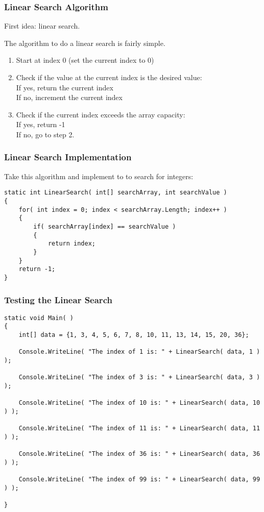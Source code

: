 \begin{frame}
\frametitle{Linear Search Algorithm}

First idea: linear search.

The algorithm to do a linear search is fairly simple.

\begin{enumerate}
\item Start at index 0 (set the current index to 0)
\item Check if the value at the current index is the desired value:\\
	\quad If yes, return the current index\\
	\quad If no, increment the current index
\item Check if the current index exceeds the array capacity:\\
	\quad If yes, return -1\\
	\quad If no, go to step 2.
\end{enumerate}

\end{frame}

\begin{frame}[fragile]
\frametitle{Linear Search Implementation}

Take this algorithm and implement to to search for integers:

{\scriptsize
\begin{verbatim}
static int LinearSearch( int[] searchArray, int searchValue )
{
    for( int index = 0; index < searchArray.Length; index++ )
    {
        if( searchArray[index] == searchValue )
        {
            return index;
        }
    }
    return -1;
}
\end{verbatim}
}
\end{frame}

\begin{frame}[fragile]
\frametitle{Testing the Linear Search}

{\scriptsize
\begin{verbatim}
static void Main( )
{
    int[] data = {1, 3, 4, 5, 6, 7, 8, 10, 11, 13, 14, 15, 20, 36};

    Console.WriteLine( "The index of 1 is: " + LinearSearch( data, 1 ) );
    
    Console.WriteLine( "The index of 3 is: " + LinearSearch( data, 3 ) );
    
    Console.WriteLine( "The index of 10 is: " + LinearSearch( data, 10 ) );
    
    Console.WriteLine( "The index of 11 is: " + LinearSearch( data, 11 ) );
    
    Console.WriteLine( "The index of 36 is: " + LinearSearch( data, 36 ) );
    
    Console.WriteLine( "The index of 99 is: " + LinearSearch( data, 99 ) );
        
}
\end{verbatim}
}

\end{frame}

